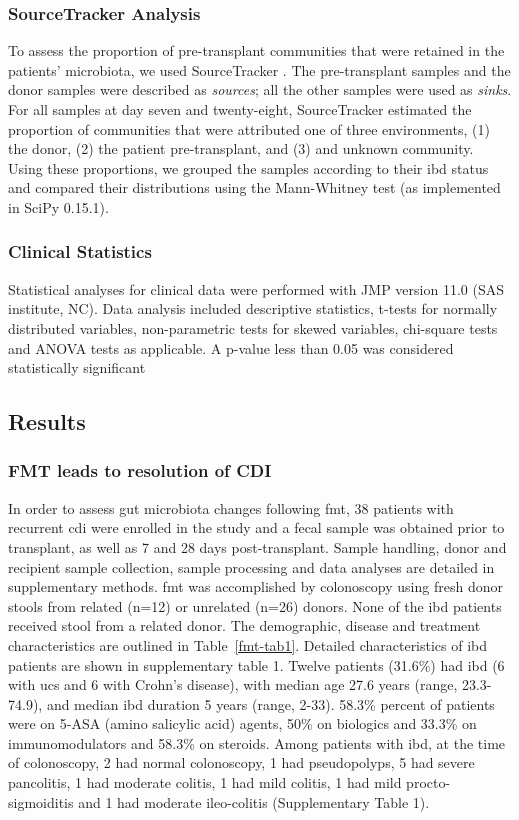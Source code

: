 \subsubsection{SourceTracker Analysis}
To assess the proportion of pre-transplant communities that were retained in the patients' microbiota, we used SourceTracker \cite{RN3995}. The pre-transplant samples and the donor samples were described as \textit{sources}; all the other samples were used as \textit{sinks}. For all samples at day seven and twenty-eight, SourceTracker estimated the proportion of communities that were attributed one of three environments, (1) the donor, (2) the patient pre-transplant, and (3) and unknown community. Using these proportions, we grouped the samples according to their \gls{ibd} status and compared their distributions using the Mann-Whitney test (as implemented in SciPy 0.15.1\cite{RN1516fmt}).

\subsubsection{Clinical Statistics}
Statistical analyses for clinical data were performed with JMP version 11.0 (SAS institute, NC).  Data analysis included descriptive statistics, t-tests for normally distributed variables, non-parametric tests for skewed variables, chi-square tests and ANOVA tests as applicable. A p-value less than 0.05 was considered statistically significant


\subsection{Results}

\subsubsection{FMT leads to resolution of CDI}
In order to assess gut microbiota changes following \gls{fmt}, 38 patients with recurrent \gls{cdi} were enrolled in the study and a fecal sample was obtained prior to transplant, as well as 7 and 28 days post-transplant. Sample handling, donor and recipient sample collection, sample processing and data analyses are detailed in supplementary methods. \gls{fmt} was accomplished by colonoscopy using fresh donor stools from related (n=12) or unrelated (n=26) donors. None of the \gls{ibd} patients received stool from a related donor. The demographic, disease and treatment characteristics are outlined in Table~\ref{fmt-tab1}. Detailed characteristics of \gls{ibd} patients are shown in supplementary table 1. Twelve patients (31.6\%) had \gls{ibd} (6 with \glspl{uc} and 6 with Crohn's disease), with median age 27.6 years (range, 23.3-74.9), and median \gls{ibd} duration 5 years (range, 2-33). 58.3\% percent of patients were on 5-ASA (amino salicylic acid) agents, 50\% on biologics and 33.3\% on immunomodulators and 58.3\% on steroids.  Among patients with \gls{ibd}, at the time of colonoscopy, 2 had normal colonoscopy, 1 had pseudopolyps, 5 had severe pancolitis, 1 had moderate colitis, 1 had mild colitis, 1 had mild procto-sigmoiditis and 1 had moderate ileo-colitis (Supplementary Table 1).

